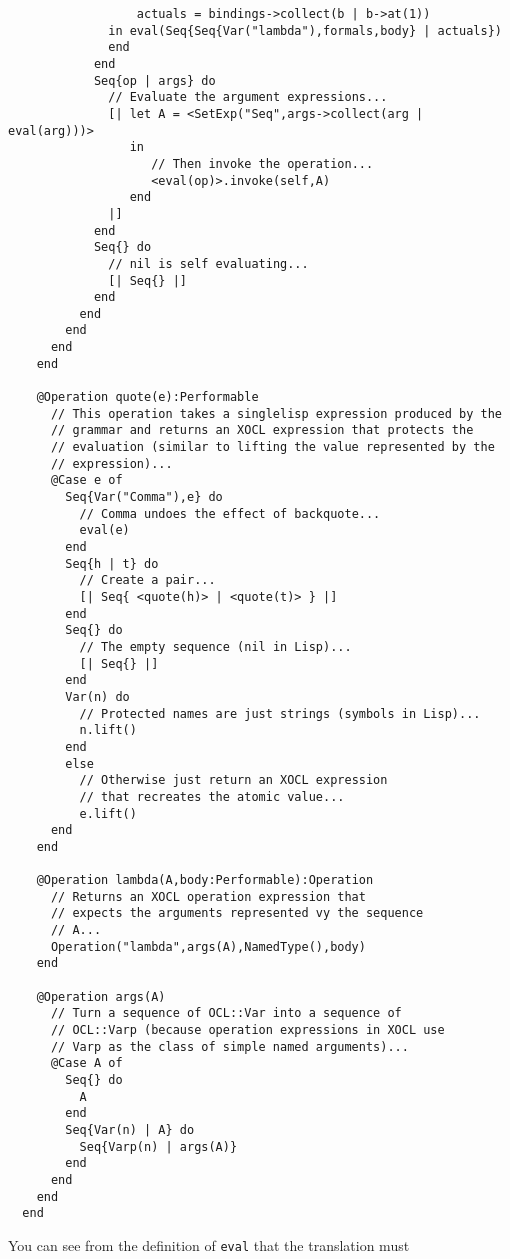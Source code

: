 \begin{lstlisting}
                  actuals = bindings->collect(b | b->at(1))
              in eval(Seq{Seq{Var("lambda"),formals,body} | actuals})
              end
            end           
            Seq{op | args} do           
              // Evaluate the argument expressions...             
              [| let A = <SetExp("Seq",args->collect(arg | eval(arg)))>
                 in 
                    // Then invoke the operation...                   
                    <eval(op)>.invoke(self,A)
                 end
              |]
            end           
            Seq{} do             
              // nil is self evaluating...             
              [| Seq{} |]
            end
          end
        end
      end
    end
    
    @Operation quote(e):Performable   
      // This operation takes a singlelisp expression produced by the
      // grammar and returns an XOCL expression that protects the
      // evaluation (similar to lifting the value represented by the
      // expression)...      
      @Case e of     
        Seq{Var("Comma"),e} do       
          // Comma undoes the effect of backquote...          
          eval(e)
        end        
        Seq{h | t} do        
          // Create a pair...          
          [| Seq{ <quote(h)> | <quote(t)> } |]
        end        
        Seq{} do         
          // The empty sequence (nil in Lisp)...         
          [| Seq{} |] 
        end        
        Var(n) do        
          // Protected names are just strings (symbols in Lisp)...          
          n.lift()
        end        
        else         
          // Otherwise just return an XOCL expression
          // that recreates the atomic value...          
          e.lift()
      end
    end
    
    @Operation lambda(A,body:Performable):Operation     
      // Returns an XOCL operation expression that
      // expects the arguments represented vy the sequence
      // A...     
      Operation("lambda",args(A),NamedType(),body)
    end
    
    @Operation args(A)     
      // Turn a sequence of OCL::Var into a sequence of
      // OCL::Varp (because operation expressions in XOCL use
      // Varp as the class of simple named arguments)...      
      @Case A of      
        Seq{} do
          A
        end        
        Seq{Var(n) | A} do
          Seq{Varp(n) | args(A)} 
        end       
      end
    end
  end
\end{lstlisting}
You can see from the definition of {\tt eval} that the translation must
